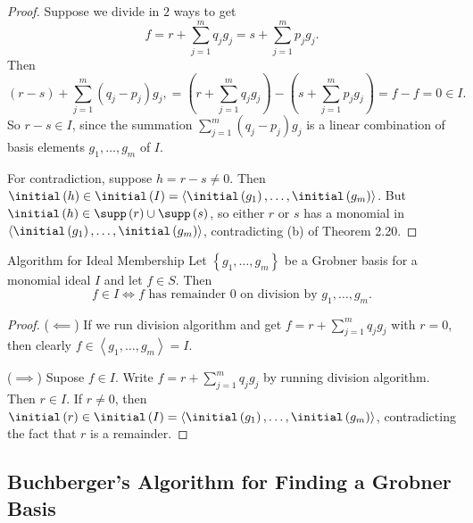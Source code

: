 \documentclass[co439]{subfiles}
\begin{document}
    \begin{proof}
        Suppose we divide in $2$ ways to get
        \begin{equation*}
            f = r + \sum^{m}_{j=1} q_jg_j = s + \sum^{m}_{j=1} p_jg_j.
        \end{equation*}
        Then
        \begin{equation*}
            \left( r-s \right) + \sum^{m}_{j=1}\left( q_j-p_j \right)g_j,
            = \left( r+\sum^{m}_{j=1}q_jg_j \right) - \left( s+\sum^{m}_{j=1}p_jg_j \right) 
            = f-f = 0 \in I.
        \end{equation*}
        So $r-s\in I$, since the summation $\sum^{m}_{j=1}\left( q_j-p_j \right)g_j$ is a linear combination of basis elements $g_1,\ldots,g_m$ of $I$.

        For contradiction, suppose $h=r-s\neq 0$. Then $\initial\left( h \right) \in \initial\left( I \right) = \left< \initial\left( g_1 \right),\ldots,\initial\left( g_m \right) \right>$. But $\initial\left( h \right)\in\supp\left( r \right)\cup\supp\left( s \right)$, so either $r$ or $s$ has a monomial in $\left< \initial\left( g_1 \right),\ldots,\initial\left( g_m \right) \right>$, contradicting (b) of Theorem 2.20.  
    \end{proof}
    
    \begin{cor}{Algorithm for Ideal Membership}
        Let $\left\lbrace g_1,\ldots,g_m \right\rbrace$ be a Grobner basis for a monomial ideal $I$ and let $f\in S$. Then
        \begin{equation*}
            f\in I\iff\text{$f$ has remainder $0$ on division by $g_1,\ldots,g_m$}.
        \end{equation*}
    \end{cor}	

    \begin{proof}
        ($\impliedby$) If we run division algorithm and get $f = r + \sum^{m}_{j=1}q_jg_j$ with $r=0$, then clearly $f\in\left< g_1,\ldots,g_m \right> = I$.

        ($\implies$) Supose $f\in I$. Write $f = r+\sum^{m}_{j=1}q_jg_j$ by running division algorithm. Then $r\in I$. If $r\neq 0$, then $\initial\left( r \right) \in \initial\left( I \right) = \left< \initial\left( g_1 \right),\ldots,\initial\left( g_m \right) \right>$, contradicting the fact that $r$ is a remainder. 
    \end{proof}
    
    \subsection{Buchberger's Algorithm for Finding a Grobner Basis}
    
\end{document}
